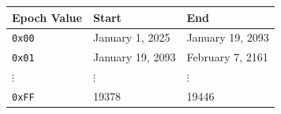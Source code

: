 \documentclass[fleqn,10pt,lineno]{wlpeerj}
\begin{document}
{\def\LTcaptype{none} %
\begin{longtable}[]{@{}lll@{}}
\toprule\noalign{}
Epoch Value & Start & End \\
\midrule\noalign{}
\endhead
\bottomrule\noalign{}
\endlastfoot
\texttt{0x00} & January 1, 2025 & January 19, 2093 \\
\texttt{0x01} & January 19, 2093 & February 7, 2161 \\
\(\vdots\) & \(\vdots\) & \(\vdots\) \\
\texttt{0xFF} & 19378 & 19446 \\
\end{longtable}
}
\end{document}
